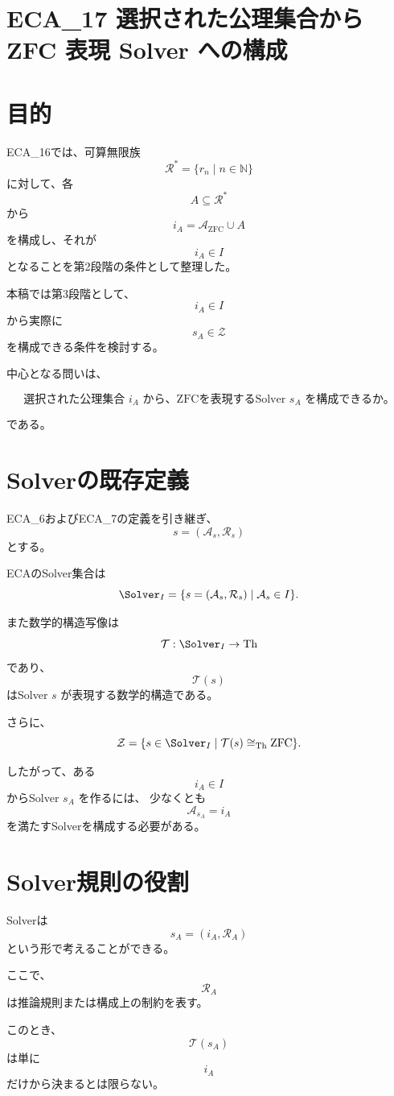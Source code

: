 \documentclass[11pt,a4paper]{article}
\begin{document}
\section{ECA\_17 選択された公理集合から ZFC 表現 Solver への構成}


\section{目的}

ECA\_16では、可算無限族
\[
\mathcal R^*=\{r_n\mid n\in\mathbb N\}
\]
に対して、各
\[
A\subseteq\mathcal R^*
\]
から
\[
i_A=\mathcal A_{\mathrm{ZFC}}\cup A
\]
を構成し、それが
\[
i_A\in I
\]
となることを第2段階の条件として整理した。

本稿では第3段階として、
\[
i_A\in I
\]
から実際に
\[
s_A\in\mathcal Z
\]
を構成できる条件を検討する。

中心となる問いは、

\[
\boxed{
\text{選択された公理集合 }i_A
\text{ から、ZFCを表現するSolver }s_A\text{ を構成できるか。}
}
\]

である。

\section{Solverの既存定義}

ECA\_6およびECA\_7の定義を引き継ぎ、
\[
s=(\mathcal A_s,\mathcal R_s)
\]
とする。

ECAのSolver集合は
\[
\Solver_I
=
\{s=(\mathcal A_s,\mathcal R_s)\mid
\mathcal A_s\in I\}.
\]

また数学的構造写像は
\[
\mathcal T:\Solver_I\to\mathrm{Th}
\]
であり、
\[
\mathcal T(s)
\]
はSolver $s$ が表現する数学的構造である。

さらに、
\[
\mathcal Z
=
\{s\in\Solver_I\mid
\mathcal T(s)\cong_{\mathrm{Th}}\mathrm{ZFC}\}.
\]

したがって、ある
\[
i_A\in I
\]
からSolver $s_A$ を作るには、
少なくとも
\[
\mathcal A_{s_A}=i_A
\]
を満たすSolverを構成する必要がある。

\section{Solver規則の役割}

Solverは
\[
s_A=(i_A,\mathcal R_A)
\]
という形で考えることができる。

ここで、
\[
\mathcal R_A
\]
は推論規則または構成上の制約を表す。

このとき、
\[
\mathcal T(s_A)
\]
は単に
\[
i_A
\]
だけから決まるとは限らない。
\end{document}
